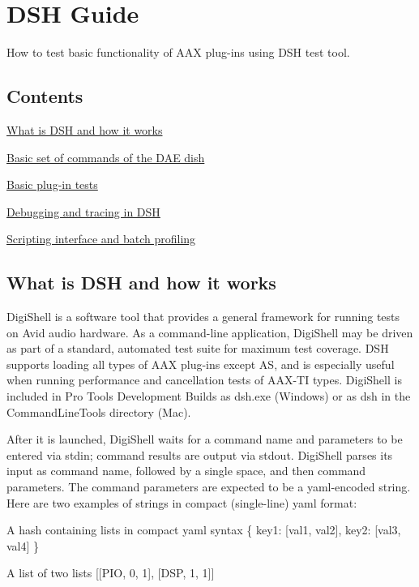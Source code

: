 \hypertarget{a00365}{}\section{D\+S\+H Guide}
\label{a00365}
How to test basic functionality of A\+A\+X plug-\/ins using D\+S\+H test tool. 

\hypertarget{a00365_dsh_guide_contents}{}\subsection{Contents}\label{a00365_dsh_guide_contents}
\begin{DoxyItemize}
\item \hyperlink{a00365_dsh_guide_00_what_is_dsh_and_how_it_works}{What is D\+S\+H and how it works} \item \hyperlink{a00365_dsh_guide_01_basic_set_of_commands_of_dae_dish}{Basic set of commands of the D\+A\+E dish} \item \hyperlink{a00365_dsh_guide_02_basic_plugin_tests}{Basic plug-\/in tests} \item \hyperlink{a00365_dsh_guide_03_debugging_and_tracing}{Debugging and tracing in D\+S\+H} \item \hyperlink{a00365_dsh_guide_04_scripting_interface_and_batch_profiling}{Scripting interface and batch profiling}\end{DoxyItemize}
 \hypertarget{a00365_dsh_guide_00_what_is_dsh_and_how_it_works}{}\subsection{What is D\+S\+H and how it works}\label{a00365_dsh_guide_00_what_is_dsh_and_how_it_works}
 Digi\+Shell is a software tool that provides a general framework for running tests on Avid audio hardware. As a command-\/line application, Digi\+Shell may be driven as part of a standard, automated test suite for maximum test coverage. D\+S\+H supports loading all types of A\+A\+X plug-\/ins except A\+S, and is especially useful when running performance and cancellation tests of A\+A\+X-\/\+T\+I types. Digi\+Shell is included in Pro Tools Development Builds as dsh.\+exe (Windows) or as dsh in the Command\+Line\+Tools directory (Mac).

After it is launched, Digi\+Shell waits for a command name and parameters to be entered via stdin; command results are output via stdout. Digi\+Shell parses its input as command name, followed by a single space, and then command parameters. The command parameters are expected to be a yaml-\/encoded string. Here are two examples of strings in compact (single-\/line) yaml format\+: 
\begin{DoxyItemize}
\item A hash containing lists in compact yaml syntax  {\ttfamily \{ key1\+: \mbox{[}val1, val2\mbox{]}, key2\+: \mbox{[}val3, val4\mbox{]} \}} ~\newline
  
\item A list of two lists  {\ttfamily \mbox{[}\mbox{[}P\+I\+O, 0, 1\mbox{]}, \mbox{[}D\+S\+P, 1, 1\mbox{]}\mbox{]}} 


\end{DoxyItemize}

